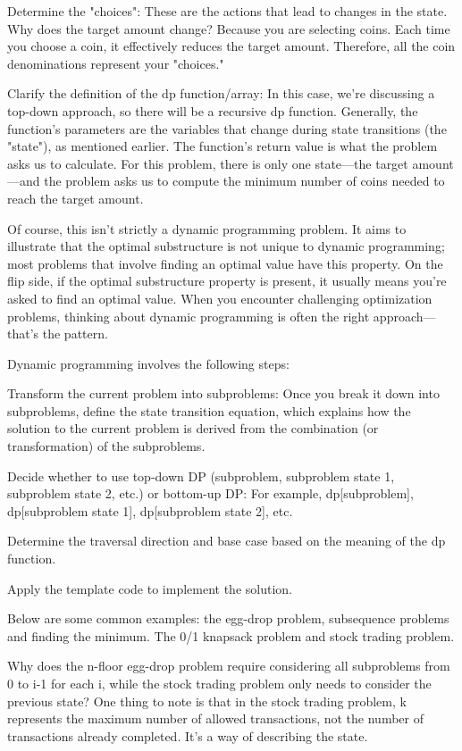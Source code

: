 \documentclass[a4paper,11pt,twoside]{book}
\begin{document}
	\par Determine the "choices": These are the actions that lead to changes in the state. Why does the target amount change? Because you are selecting coins. Each time you choose a coin, it effectively reduces the target amount. Therefore, all the coin denominations represent your "choices."
	
	\par Clarify the definition of the dp function/array: In this case, we're discussing a top-down approach, so there will be a recursive dp function. Generally, the function's parameters are the variables that change during state transitions (the "state"), as mentioned earlier. The function's return value is what the problem asks us to calculate. For this problem, there is only one state—the target amount—and the problem asks us to compute the minimum number of coins needed to reach the target amount.
	
	\par Of course, this isn’t strictly a dynamic programming problem. It aims to illustrate that the optimal substructure is not unique to dynamic programming; most problems that involve finding an optimal value have this property. On the flip side, if the optimal substructure property is present, it usually means you’re asked to find an optimal value. When you encounter challenging optimization problems, thinking about dynamic programming is often the right approach—that’s the pattern.
	
	Dynamic programming involves the following steps:
	
	Transform the current problem into subproblems: Once you break it down into subproblems, define the state transition equation, which explains how the solution to the current problem is derived from the combination (or transformation) of the subproblems.
	
	Decide whether to use top-down DP (subproblem, subproblem state 1, subproblem state 2, etc.) or bottom-up DP: For example, dp[subproblem], dp[subproblem state 1], dp[subproblem state 2], etc.
	
	Determine the traversal direction and base case based on the meaning of the dp function.
	
	Apply the template code to implement the solution.
	
	
	Below are some common examples: the egg-drop problem, subsequence problems and finding the minimum. The 0/1 knapsack problem and stock trading problem.
	
	Why does the n-floor egg-drop problem require considering all subproblems from 0 to i-1 for each i, while the stock trading problem only needs to consider the previous state?  One thing to note is that in the stock trading problem, k represents the maximum number of allowed transactions, not the number of transactions already completed. It’s a way of describing the state.
	
\end{document}
